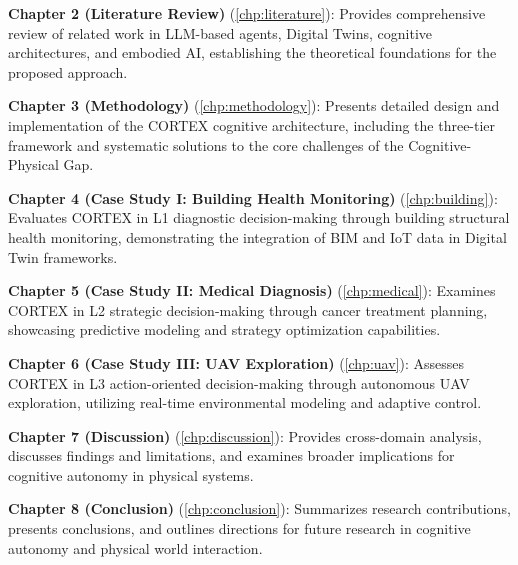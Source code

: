 \textbf{Chapter 2 (Literature Review)} (\autoref{chp:literature}): Provides comprehensive review of related work in LLM-based agents, Digital Twins, cognitive architectures, and embodied AI, establishing the theoretical foundations for the proposed approach.

\textbf{Chapter 3 (Methodology)} (\autoref{chp:methodology}): Presents detailed design and implementation of the CORTEX cognitive architecture, including the three-tier framework and systematic solutions to the core challenges of the Cognitive-Physical Gap.

\textbf{Chapter 4 (Case Study I: Building Health Monitoring)} (\autoref{chp:building}): Evaluates CORTEX in L1 diagnostic decision-making through building structural health monitoring, demonstrating the integration of BIM and IoT data in Digital Twin frameworks.

\textbf{Chapter 5 (Case Study II: Medical Diagnosis)} (\autoref{chp:medical}): Examines CORTEX in L2 strategic decision-making through cancer treatment planning, showcasing predictive modeling and strategy optimization capabilities.

\textbf{Chapter 6 (Case Study III: UAV Exploration)} (\autoref{chp:uav}): Assesses CORTEX in L3 action-oriented decision-making through autonomous UAV exploration, utilizing real-time environmental modeling and adaptive control.

\textbf{Chapter 7 (Discussion)} (\autoref{chp:discussion}): Provides cross-domain analysis, discusses findings and limitations, and examines broader implications for cognitive autonomy in physical systems.

\textbf{Chapter 8 (Conclusion)} (\autoref{chp:conclusion}): Summarizes research contributions, presents conclusions, and outlines directions for future research in cognitive autonomy and physical world interaction.
